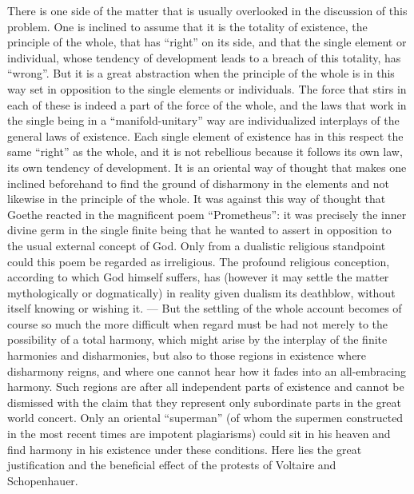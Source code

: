 \documentclass[12pt,a4paper,openany]{book}
\newcommand{\opage}[1]{\marginnote{\footnotesize\textit{[#1]}}}
\begin{document}
There is one side of the matter that is usually overlooked in the discussion of this
problem. One is inclined to assume that it is the totality of existence, the principle of
the whole, that has ``right'' on its side, and that the single element or individual,
whose tendency of development leads to a breach of this totality, has ``wrong''. But it
is a great abstraction when the principle of the whole is in this way set in opposition
to the single elements or individuals. The force that stirs in each of these is indeed a
part of the force of the whole, and the laws that work in the single being in a
``manifold-unitary'' way are individualized interplays of the general laws of existence.
Each single element of existence has in this respect the same ``right'' as the whole, and
it is not rebellious because it follows its own law, its own tendency of development. It
is an oriental way of thought that makes one inclined beforehand to find the ground of
disharmony in the elements and not likewise in the principle of the whole. It was against
this way of thought that Goethe reacted in the magnificent poem ``Prometheus'': it was
precisely the inner divine germ in the single finite being that he wanted to assert in
opposition to the usual external
concept of God. Only from a dualistic religious standpoint could this poem be regarded as
irreligious. The profound
\setcounter{footnote}{0}%
\opage{245}religious conception, according to which God himself suffers, has (however it may
settle the matter mythologically or dogmatically) in reality given dualism its deathblow,
without itself knowing or wishing it. --- But the settling of the whole account becomes of
course so much the more difficult when regard must be had not merely to the possibility
of a total harmony, which might arise by the interplay of the finite harmonies and
disharmonies, but also to those regions in existence where disharmony reigns, and where
one cannot hear how it fades into an all-embracing harmony. Such regions are after all
independent parts of existence and cannot be dismissed with the claim that they represent
only subordinate parts in the great world concert. Only an oriental ``superman'' (of whom
the supermen constructed in the most recent times are impotent plagiarisms) could sit in
his heaven and find harmony in his existence under these conditions. Here lies the great
justification and the beneficial effect of the protests of Voltaire and Schopenhauer.
\end{document}
